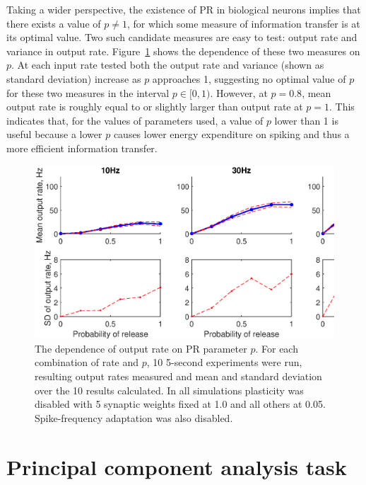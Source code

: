 \documentclass[a4paper,12pt]{report}
\theoremstyle{definition}
\begin{document}

Taking a wider perspective, the existence of PR in biological neurons implies that there exists a value of $p \neq 1$, for which some measure of information transfer is at its optimal value. Two such candidate measures are easy to test: output rate and variance in output rate. Figure~\ref{fig:exp7grid} shows the dependence of these two measures on $p$. At each input rate tested both the output rate and variance (shown as standard deviation) increase as $p$ approaches 1, suggesting no optimal value of $p$ for these two measures in the interval $p \in [0,1)$. However, at $p=0.8$, mean output rate is roughly equal to or slightly larger than output rate at $p=1$. This indicates that, for the values of parameters used, a value of $p$ lower than 1 is useful because a lower $p$ causes lower energy expenditure on spiking and thus a more efficient information transfer.

\begin{figure}[!htb]
    \includegraphics[width=\textwidth]{figures/exp7_PRoutputvariance_grid.eps}
    \caption{The dependence of output rate on PR parameter $p$. For each combination of rate and $p$, 10 5-second experiments were run, resulting output rates measured and mean and standard deviation over the 10 results calculated. In all simulations plasticity was disabled with 5 synaptic weights fixed at 1.0 and all others at 0.05. Spike-frequency adaptation was also disabled.}
    \label{fig:exp7grid}
\end{figure}








\section{Principal component analysis task} %
\label{sec:pca}
\end{document}
